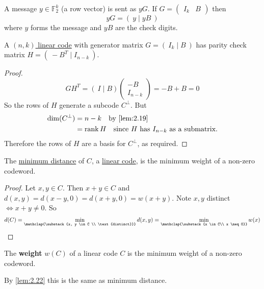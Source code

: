 \documentclass{article}
\newcommand{\F}{\mathbb{F}}
\newcommand{\1}[1]{\mathbbm{1}_{#1}}
\DeclareMathOperator{\rank}{rank}
\begin{document}
\begin{remark}
    A message $y \in \F_2^k$ (a row vector) is sent as $yG$. If $G = \left( \begin{array}{c|c} I_k & B \end{array}\right)$ then
    \begin{equation*}
        yG = \left(\ y \mid yB\ \right)
    \end{equation*}
    where $y$ forms the message and $yB$ are the check digits.
\end{remark}
\begin{nlemma}\label{lem:2.21}
    A \hyperlink{def:linearCode}{$(n, k)$ linear code} with generator matrix $G = (\ I_k \mid B \ )$ has parity check matrix $H = (\ -B^T \mid I_{n-k} \ )$.
\end{nlemma}
\begin{proof}
    \begin{equation*}
        GH^T = (\ I \mid B)
        \left(
        \begin{array}{c}
            -B \\ \hline I_{n-k}
        \end{array}
        \right) = -B + B = 0
    \end{equation*}
    So the rows of $H$ generate a subcode $C^\perp$. But
    \begin{align*}
        \dim(C^\perp) &= n-k \quad \text{by \cref{lem:2.19}} \\
                      &= \rank H \quad \text{since $H$ has $I_{n-k}$ as a submatrix.}
    \end{align*}
    Therefore the rows of $H$ are a basis for $C^\perp$, as required.
\end{proof}
\begin{nlemma}\label{lem:2.22}
    The \hyperlink{def:minimumDistanceCode}{minimum distance} of $C$, a \hyperlink{def:linearCode}{linear code}, is the minimum weight of a non-zero codeword.
\end{nlemma}
\begin{proof}
    Let $x, y \in C$. Then $x + y \in C$ and $d(x, y) = d(x-y, 0) = d(x+y, 0) = w(x+y)$.
    Note $x, y$ distinct $\iff x+y \neq 0$.
    So
\begin{equation*}d(C) = \min_{\mathclap{\substack{x, y \in C \\ \text{distinct}}}} d(x, y) = \min_{\mathclap{\substack{x \in C\\ x \neq 0}}} w(x)\qedhere\end{equation*}
\end{proof}
\begin{defi}
    The \textbf{weight} $w(C)$ of a linear code $C$ is the minimum weight of a non-zero codeword.
\end{defi}
By \cref{lem:2.22} this is the same as minimum distance.
\end{document}

